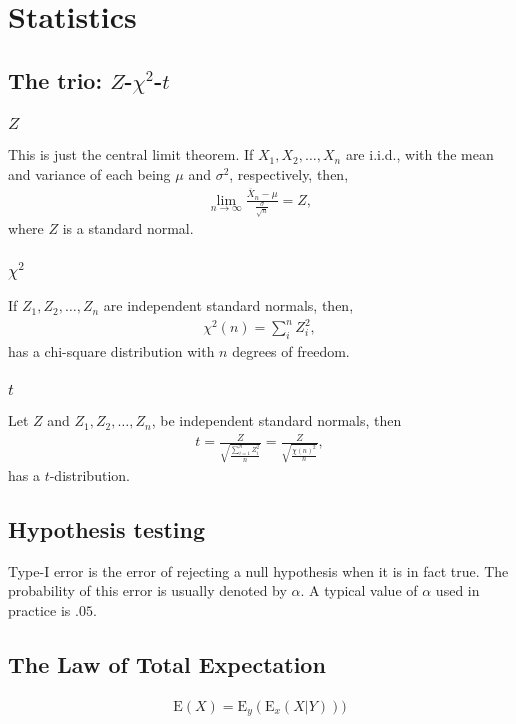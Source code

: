 \documentclass{amsart}
\theoremstyle{plain}
\numberwithin{equation}{section}
\begin{document}
\section{Statistics}

\subsection{The trio: $Z$-$\chi^2$-$t$}
\subsubsection{$Z$}
This is just the central limit theorem. If 
$X_1, X_2, \ldots, X_n$ are i.i.d., with the 
mean and variance of each being $\mu$ and 
$\sigma^2$, respectively, then,
\begin{align*}
\lim_{n \to \infty} \frac{\overline{X}_n-\mu}{\frac{\sigma}{\sqrt{n}}} = Z,
\end{align*}
where $Z$ is a standard normal. 
\subsubsection{$\chi^2$}
If $Z_1, Z_2, \ldots, Z_n$ are independent standard normals,
then, 
\begin{align*}
\chi^2(n) = \sum_{i}^{n} Z_i ^2,
\end{align*}
has a chi-square distribution with $n$ degrees of freedom.

\subsubsection{$t$}
Let $Z$ and $Z_1, Z_2, \ldots, Z_n$, be independent
standard normals, then
\begin{align*}
t = \frac{Z}{\sqrt{\frac{\sum_{i=1}^{n} Z_i ^2}{n}}}
= \frac{Z}{\sqrt{\frac{\chi(n)^2}{n}}},
\end{align*}
has a $t$-distribution. 

\subsection{Hypothesis testing}
Type-I error is the error of 
rejecting a null hypothesis when it 
is in fact true. The probability of this error
is usually denoted by $\alpha$. A typical 
value of $\alpha$ used in practice is 
$.05$.

\subsection{The Law of Total Expectation}
\begin{align*}
\mathrm{E}(X) = \mathrm{E}_y(\mathrm{E}_x(X|Y)))
\end{align*}
\end{document}
